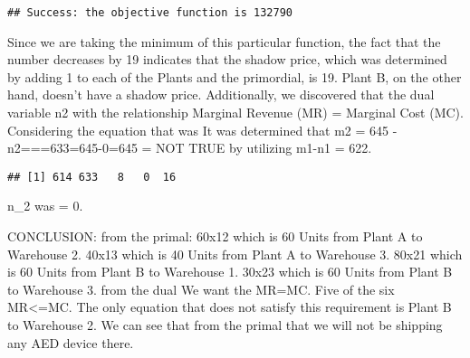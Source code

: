 \documentclass[
]{article}
\newenvironment{Shaded}{\begin{snugshade}}{\end{snugshade}}
\newcommand{\FunctionTok}[1]{\textcolor[rgb]{0.00,0.00,0.00}{#1}}
\newcommand{\NormalTok}[1]{#1}
\newcommand{\SpecialCharTok}[1]{\textcolor[rgb]{0.00,0.00,0.00}{#1}}
\newcommand{\StringTok}[1]{\textcolor[rgb]{0.31,0.60,0.02}{#1}}
\begin{document}
\begin{verbatim}
## Success: the objective function is 132790
\end{verbatim}

Since we are taking the minimum of this particular function, the fact
that the number decreases by 19 indicates that the shadow price, which
was determined by adding 1 to each of the Plants and the primordial, is
19. Plant B, on the other hand, doesn't have a shadow price.
Additionally, we discovered that the dual variable n2 with the
relationship Marginal Revenue (MR) = Marginal Cost (MC). Considering the
equation that was It was determined that m2 = 645 -n2===633=645-0=645 =
NOT TRUE by utilizing m1-n1 = 622.

\begin{Shaded}
\end{Shaded}

\begin{verbatim}
## [1] 614 633   8   0  16
\end{verbatim}

n\_2 was = 0.

CONCLUSION: from the primal: 60x12 which is 60 Units from Plant A to
Warehouse 2. 40x13 which is 40 Units from Plant A to Warehouse 3. 80x21
which is 60 Units from Plant B to Warehouse 1. 30x23 which is 60 Units
from Plant B to Warehouse 3. from the dual We want the MR=MC. Five of
the six MR\textless=MC. The only equation that does not satisfy this
requirement is Plant B to Warehouse 2. We can see that from the primal
that we will not be shipping any AED device there.
\end{document}
